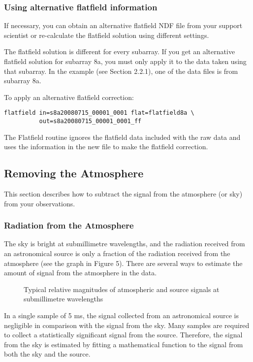 \documentclass[twoside,11pt]{article}
\renewcommand{\_}{\texttt{\symbol{95}}}
\begin{document}
\subsubsection{Using alternative flatfield information}

If necessary, you can obtain an alternative flatfield NDF file from
your support scientist or re-calculate the flatfield solution using
different settings.

The flatfield solution is different for every subarray. If you get an
alternative flatfield solution for subarray 8a, you must only apply it
to the data taken using that subarray. In the example (see Section
2.2.1), one of the data files is from subarray 8a.

To apply an alternative flatfield correction:
\begin{verbatim}
flatfield in=s8a20080715_00001_0001 flat=flatfield8a \
          out=s8a20080715_00001_0001_ff
\end{verbatim}
The Flatfield routine ignores the flatfield data included with the raw
data and uses the information in the new file to make the flatfield
correction.

\subsection{Removing the Atmosphere}

This section describes how to subtract the signal from the atmosphere
(or sky) from your observations.

\subsubsection{Radiation from the Atmosphere}

The sky is bright at submillimetre wavelengths, and the radiation received from
an astronomical source is only a fraction of the radiation received from the
atmosphere (see the graph in Figure 5). There are several ways to estimate the
amount of signal from the atmosphere in the data.

\begin{figure}
\caption{Typical relative magnitudes of atmospheric and source signals
  at submillimetre wavelengths}
\end{figure}

In a single sample of 5 ms, the signal collected from an astronomical
source is negligible in comparison with the signal from the sky. Many
samples are required to collect a statistically significant signal
from the source. Therefore, the signal from the sky is estimated by
fitting a mathematical function to the signal from both the sky and
the source.
\end{document}
